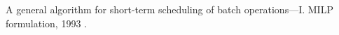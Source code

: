 \documentclass[12pt, twoside]{article}
\theoremstyle{definition}
\begin{document}
\begin{thebibliography}{99}
    A general algorithm for short-term scheduling of batch operations—I. MILP formulation, 1993
	.
	
%
%	


 	
\end{thebibliography}

\end{document}

